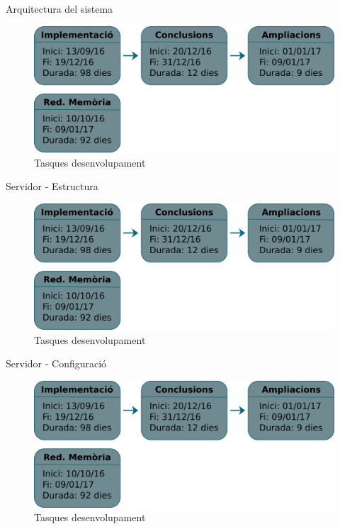 \documentclass[xcolor=table]{beamer}
\begin{document}
	\begin{frame}{Arquitectura del sistema}
		\centering
		\begin{figure}
			\includegraphics[width=\textwidth-1cm]{tasques}
			\vspace{0.2cm}
			\caption{Tasques desenvolupament}
		\end{figure}
	\end{frame}

	\begin{frame}{Servidor - Estructura}
		\centering
		\begin{figure}
			\includegraphics[width=\textwidth-1cm]{tasques}
			\vspace{0.2cm}
			\caption{Tasques desenvolupament}
		\end{figure}
	\end{frame}

	\begin{frame}{Servidor - Configuració}
		\centering
		\begin{figure}
			\includegraphics[width=\textwidth-1cm]{tasques}
			\vspace{0.2cm}
			\caption{Tasques desenvolupament}
		\end{figure}
	\end{frame}
\end{document}
